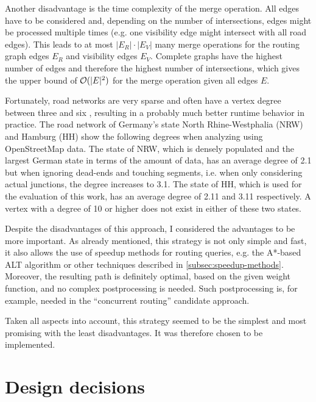 		Another disadvantage is the time complexity of the merge operation.
		All edges have to be considered and, depending on the number of intersections, edges might be processed multiple times (e.g. one visibility edge might intersect with all road edges).
		This leads to at most $|E_R| \cdot |E_V|$ many merge operations for the routing graph edges $E_R$ and visibility edges $E_V$.
		Complete graphs have the highest number of edges and therefore the highest number of intersections, which gives the upper bound of $\mathcal{O}(|E|^2)$ for the merge operation given all edges $E$.
		
		Fortunately, road networks are very sparse and often have a vertex degree between three and six \cite{zhao-analysis-osm-bejing}\cite{boeing-osmnx}, resulting in a probably much better runtime behavior in practice.
		The road network of Germany's state North Rhine-Westphalia (NRW) and Hamburg (HH) show the following degrees when analyzing using OpenStreetMap data.
		The state of NRW, which is densely populated and the largest German state in terms of the amount of data, has an average degree of 2.1 but when ignoring dead-ends and touching segments, i.e. when only considering actual junctions, the degree increases to 3.1.
		The state of HH, which is used for the evaluation of this work, has an average degree of 2.11 and 3.11 respectively.
		A vertex with a degree of 10 or higher does not exist in either of these two states.
		
		Despite the disadvantages of this approach, I considered the advantages to be more important.
		As already mentioned, this strategy is not only simple and fast, it also allows the use of speedup methods for routing queries, e.g. the A*-based ALT algorithm or other techniques described in \cref{subsec:speedup-methods}.
		Moreover, the resulting path is definitely optimal, based on the given weight function, and no complex postprocessing is needed.
		Such postprocessing is, for example, needed in the \enquote{concurrent routing} candidate approach.
		
		Taken all aspects into account, this strategy seemed to be the simplest and most promising with the least disadvantages.
		It was therefore chosen to be implemented.

\section{Design decisions}
\label{sec:design-decisions}

